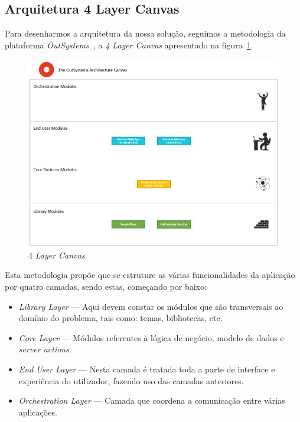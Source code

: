 \newpage

\subsection{Arquitetura 4 Layer Canvas}\label{sec:4lc}

Para desenharmos a arquitetura da nossa solução, seguimos a metodologia da plataforma \textit{OutSystems~\cite{outsystems}}, a \textit{4 Layer Canvas} apresentado na figura~\ref{fig:4lc}.

\begin{figure}[H]
  \centering 
  \includegraphics[scale=0.5]{figures/4LayerCanvas.png}
  \caption{4 \textit{Layer Canvas}}\label{fig:4lc}
\end{figure}

Esta metodologia propõe que se estruture as várias funcionalidades da aplicação por quatro camadas, sendo estas, começando por baixo: 

\begin{itemize}
    \item \textit{Library Layer} --- Aqui devem constar os módulos que são transversais ao domínio do problema, tais como: temas, bibliotecas, etc. 
    \item \textit{Core Layer} --- Módulos referentes à lógica de negócio, modelo de dados e \textit{server actions}. 
    \item \textit{End User Layer} --- Nesta camada é tratada toda a parte de interface e experiência do utilizador, fazendo uso das camadas anteriores. 
    \item \textit{Orchestration Layer} --- Camada que coordena a comunicação entre várias aplicações. 
\end{itemize}

